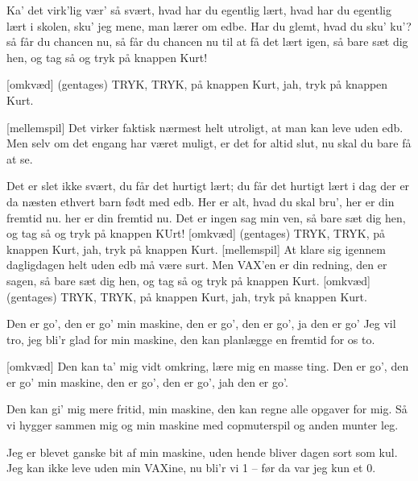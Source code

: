 \documentclass[a4paper,11pt]{article}
\begin{document}
\begin{song}


%
Ka' det virk'lig vær' så svært,
hvad har du egentlig lært,
 hvad har du egentlig lært
%
i skolen, sku' jeg mene,
man lærer om edbe.
Har du glemt, hvad du sku' ku'?
så får du chancen nu,
 så får du chancen nu
%
til at få det lært igen,
så bare sæt dig hen,
og tag så og tryk på knappen Kurt!

[omkvæd] (gentages)%
TRYK, TRYK, på knappen Kurt,
jah, tryk på knappen Kurt.

[mellemspil]%
Det virker faktisk nærmest helt utroligt,
at man kan leve uden edb.
Men selv om det engang har været muligt,
er det for altid slut,
nu skal du bare få at se.

%
Det er slet ikke svært,
du får det hurtigt lært;
 du får det hurtigt lært
%
i dag der er da næsten
ethvert barn født med edb.
Her er alt, hvad du skal bru',
her er din fremtid nu.
 her er din fremtid nu.
%
Det er ingen sag min ven,
så bare sæt dig hen,
og tag så og tryk på knappen KUrt!
[omkvæd] (gentages)%
TRYK, TRYK, på knappen Kurt,
jah, tryk på knappen Kurt.
[mellemspil]%
At klare sig igennem dagligdagen
helt uden edb må være surt.
Men VAX'en er din redning, den er sagen,
så bare sæt dig hen,
og tag så og tryk på knappen Kurt.
[omkvæd] (gentages)%
TRYK, TRYK, på knappen Kurt,
jah, tryk på knappen Kurt.
\end{song}

\begin{song}


%
Den er go', den er go' min maskine,
den er go', den er go', ja den er go'
Jeg vil tro, jeg bli'r glad for min maskine,
den kan planlægge en fremtid for os to.

[omkvæd]%
Den kan ta' mig vidt omkring,
lære mig en masse ting.
Den er go', den er go' min maskine,
den er go', den er go', jah den er go'.

%
Den kan gi' mig mere fritid, min maskine,
den kan regne alle opgaver for mig.
Så vi hygger sammen mig og min maskine
med copmuterspil og anden munter leg.

%
Jeg er blevet ganske bit af min maskine,
uden hende bliver dagen sort som kul.
Jeg kan ikke leve uden min VAXine,
nu bli'r vi 1 -- før da var jeg kun et 0.
\end{song}
\end{document}
